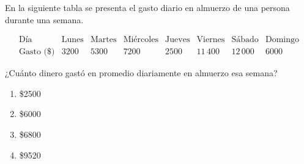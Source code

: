 \begin{problem}
    En la siguiente tabla se presenta el gasto diario en almuerzo de una persona durante una semana.

    \[
    \begin{array}{c|ccccccc}
    \text{Día} & \text{Lunes} & \text{Martes} & \text{Miércoles} & \text{Jueves} & \text{Viernes} & \text{Sábado} & \text{Domingo} \\
    \hline
    \text{Gasto (\$)} & 3200 & 5300 & 7200 & 2500 & 11\,400 & 12\,000 & 6000
    \end{array}
    \]

    ¿Cuánto dinero gastó en promedio diariamente en almuerzo esa semana?

    \begin{enumerate}[label=\Alph*.]
        \item \$2500
        \item \$6000
        \item \$6800
        \item \$9520
    \end{enumerate}
\end{problem}
